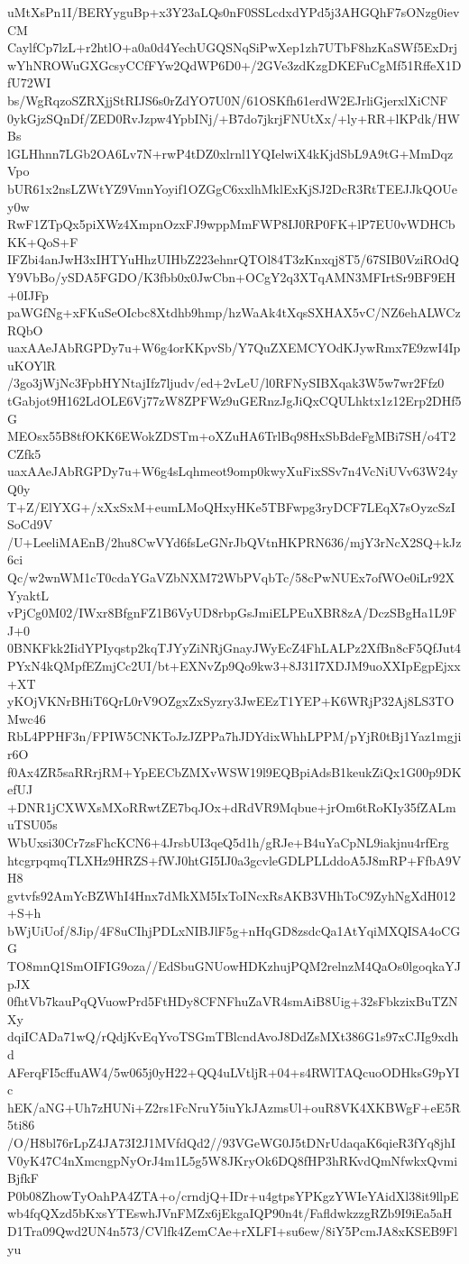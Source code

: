 uMtXsPn1I/BERYyguBp+x3Y23aLQs0nF0SSLcdxdYPd5j3AHGQhF7sONzg0ievCM
CaylfCp7lzL+r2htlO+a0a0d4YechUGQSNqSiPwXep1zh7UTbF8hzKaSWf5ExDrj
wYhNROWuGXGcsyCCfFYw2QdWP6D0+/2GVe3zdKzgDKEFuCgMf51RffeX1DfU72WI
bs/WgRqzoSZRXjjStRIJS6s0rZdYO7U0N/61OSKfh61erdW2EJrliGjerxlXiCNF
0ykGjzSQnDf/ZED0RvJzpw4YpbINj/+B7do7jkrjFNUtXx/+ly+RR+lKPdk/HWBs
lGLHhnn7LGb2OA6Lv7N+rwP4tDZ0xlrnl1YQIelwiX4kKjdSbL9A9tG+MmDqzVpo
bUR61x2nsLZWtYZ9VmnYoyif1OZGgC6xxlhMklExKjSJ2DcR3RtTEEJJkQOUey0w
RwF1ZTpQx5piXWz4XmpnOzxFJ9wppMmFWP8IJ0RP0FK+lP7EU0vWDHCbKK+QoS+F
IFZbi4anJwH3xIHTYuHhzUIHbZ223ehnrQTOl84T3zKnxqj8T5/67SIB0VziROdQ
Y9VbBo/ySDA5FGDO/K3fbb0x0JwCbn+OCgY2q3XTqAMN3MFIrtSr9BF9EH+0IJFp
paWGfNg+xFKuSeOIcbc8Xtdhb9hmp/hzWaAk4tXqsSXHAX5vC/NZ6ehALWCzRQbO
uaxAAeJAbRGPDy7u+W6g4orKKpvSb/Y7QuZXEMCYOdKJywRmx7E9zwI4IpuKOYlR
/3go3jWjNc3FpbHYNtajIfz7ljudv/ed+2vLeU/l0RFNySIBXqak3W5w7wr2Ffz0
tGabjot9H162LdOLE6Vj77zW8ZPFWz9uGERnzJgJiQxCQULhktx1z12Erp2DHf5G
MEOsx55B8tfOKK6EWokZDSTm+oXZuHA6TrlBq98HxSbBdeFgMBi7SH/o4T2CZfk5
uaxAAeJAbRGPDy7u+W6g4sLqhmeot9omp0kwyXuFixSSv7n4VcNiUVv63W24yQ0y
T+Z/ElYXG+/xXxSxM+eumLMoQHxyHKe5TBFwpg3ryDCF7LEqX7sOyzcSzISoCd9V
/U+LeeliMAEnB/2hu8CwVYd6fsLeGNrJbQVtnHKPRN636/mjY3rNcX2SQ+kJz6ci
Qc/w2wnWM1cT0cdaYGaVZbNXM72WbPVqbTc/58cPwNUEx7ofWOe0iLr92XYyaktL
vPjCg0M02/IWxr8BfgnFZ1B6VyUD8rbpGsJmiELPEuXBR8zA/DczSBgHa1L9FJ+0
0BNKFkk2IidYPIyqstp2kqTJYyZiNRjGnayJWyEcZ4FhLALPz2XfBn8cF5QfJut4
PYxN4kQMpfEZmjCc2UI/bt+EXNvZp9Qo9kw3+8J31I7XDJM9uoXXIpEgpEjxx+XT
yKOjVKNrBHiT6QrL0rV9OZgxZxSyzry3JwEEzT1YEP+K6WRjP32Aj8LS3TOMwc46
RbL4PPHF3n/FPIW5CNKToJzJZPPa7hJDYdixWhhLPPM/pYjR0tBj1Yaz1mgjir6O
f0Ax4ZR5saRRrjRM+YpEECbZMXvWSW19l9EQBpiAdsB1keukZiQx1G00p9DKefUJ
+DNR1jCXWXsMXoRRwtZE7bqJOx+dRdVR9Mqbue+jrOm6tRoKIy35fZALmuTSU05s
WbUxsi30Cr7zsFhcKCN6+4JrsbUI3qeQ5d1h/gRJe+B4uYaCpNL9iakjnu4rfErg
htcgrpqmqTLXHz9HRZS+fWJ0htGI5IJ0a3gcvleGDLPLLddoA5J8mRP+FfbA9VH8
gvtvfs92AmYcBZWhI4Hnx7dMkXM5IxToINcxRsAKB3VHhToC9ZyhNgXdH012+S+h
bWjUiUof/8Jip/4F8uCIhjPDLxNIBJlF5g+nHqGD8zsdcQa1AtYqiMXQISA4oCGG
TO8mnQ1SmOIFIG9oza//EdSbuGNUowHDKzhujPQM2relnzM4QaOs0lgoqkaYJpJX
0fhtVb7kauPqQVuowPrd5FtHDy8CFNFhuZaVR4smAiB8Uig+32sFbkzixBuTZNXy
dqiICADa71wQ/rQdjKvEqYvoTSGmTBlcndAvoJ8DdZsMXt386G1s97xCJIg9xdhd
AFerqFI5cffuAW4/5w065j0yH22+QQ4uLVtljR+04+s4RWlTAQcuoODHksG9pYIc
hEK/aNG+Uh7zHUNi+Z2rs1FcNruY5iuYkJAzmsUl+ouR8VK4XKBWgF+eE5R5ti86
/O/H8bl76rLpZ4JA73I2J1MVfdQd2//93VGeWG0J5tDNrUdaqaK6qieR3fYq8jhI
V0yK47C4nXmcngpNyOrJ4m1L5g5W8JKryOk6DQ8fHP3hRKvdQmNfwkxQvmiBjfkF
P0b08ZhowTyOahPA4ZTA+o/crndjQ+IDr+u4gtpsYPKgzYWIeYAidXl38it9llpE
wb4fqQXzd5bKxsYTEswhJVnFMZx6jEkgaIQP90n4t/FafldwkzzgRZb9I9iEa5aH
D1Tra09Qwd2UN4n573/CVlfk4ZemCAe+rXLFI+su6ew/8iY5PcmJA8xKSEB9Flyu
